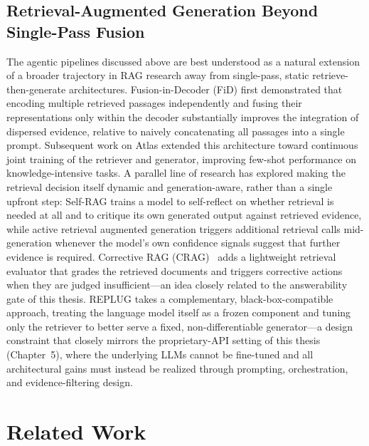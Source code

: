 \subsection{Retrieval-Augmented Generation Beyond Single-Pass Fusion}

The agentic pipelines discussed above are best understood as a natural extension of a broader trajectory in RAG research away from single-pass, static retrieve-then-generate architectures. Fusion-in-Decoder (FiD) \citep{izacard2021leveraging} first demonstrated that encoding multiple retrieved passages independently and fusing their representations only within the decoder substantially improves the integration of dispersed evidence, relative to naively concatenating all passages into a single prompt. Subsequent work on Atlas \citep{izacard2023atlas} extended this architecture toward continuous joint training of the retriever and generator, improving few-shot performance on knowledge-intensive tasks. A parallel line of research has explored making the retrieval decision itself dynamic and generation-aware, rather than a single upfront step: Self-RAG \citep{asai2024selfrag} trains a model to self-reflect on whether retrieval is needed at all and to critique its own generated output against retrieved evidence, while active retrieval augmented generation \citep{jiang2023active} triggers additional retrieval calls mid-generation whenever the model's own confidence signals suggest that further evidence is required. Corrective RAG (CRAG)~\citep{yan2024crag} adds a lightweight retrieval evaluator that grades the retrieved documents and triggers corrective actions when they are judged insufficient---an idea closely related to the answerability gate of this thesis. REPLUG \citep{shi2024replug} takes a complementary, black-box-compatible approach, treating the language model itself as a frozen component and tuning only the retriever to better serve a fixed, non-differentiable generator---a design constraint that closely mirrors the proprietary-API setting of this thesis (Chapter~5), where the underlying LLMs cannot be fine-tuned and all architectural gains must instead be realized through prompting, orchestration, and evidence-filtering design.

\section{Related Work}
\label{sec:related-work}

